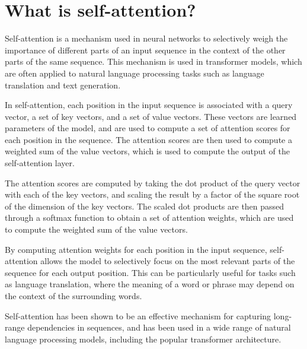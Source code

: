 \section{What is self-attention?}
Self-attention is a mechanism used in neural networks to selectively weigh the importance of different parts of an input sequence in the context of the other parts of the same sequence. This mechanism is used in transformer models, which are often applied to natural language processing tasks such as language translation and text generation.

In self-attention, each position in the input sequence is associated with a query vector, a set of key vectors, and a set of value vectors. These vectors are learned parameters of the model, and are used to compute a set of attention scores for each position in the sequence. The attention scores are then used to compute a weighted sum of the value vectors, which is used to compute the output of the self-attention layer.

The attention scores are computed by taking the dot product of the query vector with each of the key vectors, and scaling the result by a factor of the square root of the dimension of the key vectors. The scaled dot products are then passed through a softmax function to obtain a set of attention weights, which are used to compute the weighted sum of the value vectors.

By computing attention weights for each position in the input sequence, self-attention allows the model to selectively focus on the most relevant parts of the sequence for each output position. This can be particularly useful for tasks such as language translation, where the meaning of a word or phrase may depend on the context of the surrounding words.

Self-attention has been shown to be an effective mechanism for capturing long-range dependencies in sequences, and has been used in a wide range of natural language processing models, including the popular transformer architecture.

